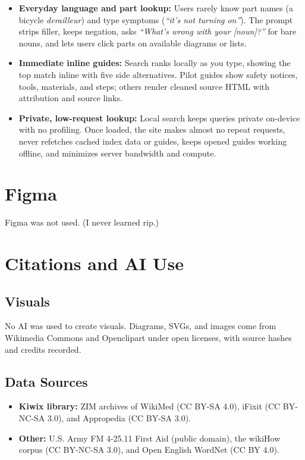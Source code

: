 \documentclass[10pt,letterpaper]{article}
\begin{document}
\begin{itemize}
    \item \textbf{Everyday language and part lookup:} Users rarely know part names (a bicycle \textit{derailleur}) and type symptoms (\textit{``it's not turning on''}). The prompt strips filler, keeps negation, asks \textit{``What's wrong with your [noun]?''} for bare nouns, and lets users click parts on available diagrams or lists.
    \item \textbf{Immediate inline guides:} Search ranks locally as you type, showing the top match inline with five side alternatives. Pilot guides show safety notices, tools, materials, and steps; others render cleaned source HTML with attribution and source links.
    \item \textbf{Private, low-request lookup:} Local search keeps queries private on-device with no profiling. Once loaded, the site makes almost no repeat requests, never refetches cached index data or guides, keeps opened guides working offline, and minimizes server bandwidth and compute.
\end{itemize}

\section{Figma}

Figma was not used. (I never learned rip.)

\section{Citations and AI Use}

\subsection{Visuals}
No AI was used to create visuals. Diagrams, SVGs, and images come from Wikimedia Commons and Openclipart under open licenses, with source hashes and credits recorded.

\subsection{Data Sources}
\begin{itemize}
    \item \textbf{Kiwix library:} ZIM archives of WikiMed (CC BY-SA 4.0), iFixit (CC BY-NC-SA 3.0), and Appropedia (CC BY-SA 3.0).
    \item \textbf{Other:} U.S. Army FM 4-25.11 First Aid (public domain), the wikiHow corpus (CC BY-NC-SA 3.0), and Open English WordNet (CC BY 4.0).
\end{itemize}
\end{document}
